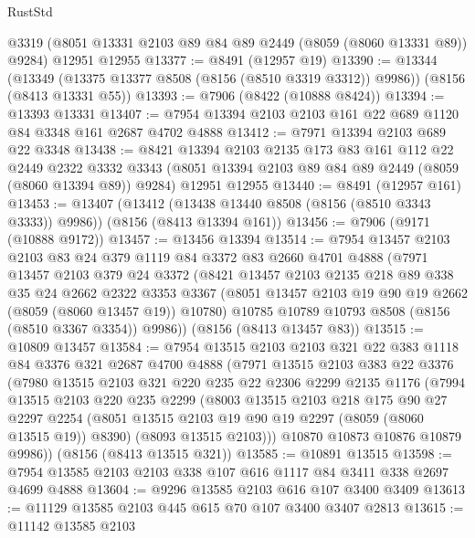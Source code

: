 \begin{lexlean}{RustStd}
\begin{coremodule}
    @3319
    (@8051 @13331 @2103 @89 @84 @89 @2449 (@8059 (@8060 @13331 @89)) @9284)
    @12951
    @12955
@13377 := @8491 (@12957 @19)
@13390 := @13344
    (@13349 (@13375 @13377 @8508 (@8156 (@8510 @3319 @3312)) @9986))
    (@8156 (@8413 @13331 @55))
@13393 := @7906 (@8422 (@10888 @8424))
@13394 := @13393 @13331
@13407 := @7954 @13394 @2103 @2103 @161 @22 @689 @1120 @84 @3348 @161 @2687 @4702 @4888
@13412 := @7971 @13394 @2103 @689 @22 @3348
@13438 := @8421
    @13394
    @2103
    @2135
    @173
    @83
    @161
    @112
    @22
    @2449
    @2322
    @3332
    @3343
    (@8051 @13394 @2103 @89 @84 @89 @2449 (@8059 (@8060 @13394 @89)) @9284)
    @12951
    @12955
@13440 := @8491 (@12957 @161)
@13453 := @13407
    (@13412 (@13438 @13440 @8508 (@8156 (@8510 @3343 @3333)) @9986))
    (@8156 (@8413 @13394 @161))
@13456 := @7906 (@9171 (@10888 @9172))
@13457 := @13456 @13394
@13514 := @7954
    @13457
    @2103
    @2103
    @83
    @24
    @379
    @1119
    @84
    @3372
    @83
    @2660
    @4701
    @4888
    (@7971
      @13457
      @2103
      @379
      @24
      @3372
      (@8421
        @13457
        @2103
        @2135
        @218
        @89
        @338
        @35
        @24
        @2662
        @2322
        @3353
        @3367
        (@8051 @13457 @2103 @19 @90 @19 @2662 (@8059 (@8060 @13457 @19)) @10780)
        @10785
        @10789
        @10793
        @8508
        (@8156 (@8510 @3367 @3354))
        @9986))
    (@8156 (@8413 @13457 @83))
@13515 := @10809 @13457
@13584 := @7954
    @13515
    @2103
    @2103
    @321
    @22
    @383
    @1118
    @84
    @3376
    @321
    @2687
    @4700
    @4888
    (@7971
      @13515
      @2103
      @383
      @22
      @3376
      (@7980
        @13515
        @2103
        @321
        @220
        @235
        @22
        @2306
        @2299
        @2135
        @1176
        (@7994
          @13515
          @2103
          @220
          @235
          @2299
          (@8003
            @13515
            @2103
            @218
            @175
            @90
            @27
            @2297
            @2254
            (@8051 @13515 @2103 @19 @90 @19 @2297 (@8059 (@8060 @13515 @19)) @8390)
            (@8093 @13515 @2103)))
        @10870
        @10873
        @10876
        @10879
        @9986))
    (@8156 (@8413 @13515 @321))
@13585 := @10891 @13515
@13598 := @7954 @13585 @2103 @2103 @338 @107 @616 @1117 @84 @3411 @338 @2697 @4699 @4888
@13604 := @9296 @13585 @2103 @616 @107 @3400 @3409
@13613 := @11129 @13585 @2103 @445 @615 @70 @107 @3400 @3407 @2813
@13615 := @11142 @13585 @2103

\end{coremodule}
\end{lexlean}
